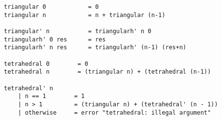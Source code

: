 \fontsize{8pt}{10pt}
\begin{verbatim}
triangular 0            = 0
triangular n            = n + triangular (n-1)

triangular' n           = triangularh' n 0
triangularh' 0 res      = res
triangularh' n res      = triangularh' (n-1) (res+n)

tetrahedral 0        = 0
tetrahedral n        = (triangular n) + (tetrahedral (n-1))

tetrahedral' n
	| n == 1        = 1
	| n > 1         = (triangular n) + (tetrahedral' (n - 1))
	| otherwise	    = error "tetrahedral: illegal argument"
\end{verbatim}